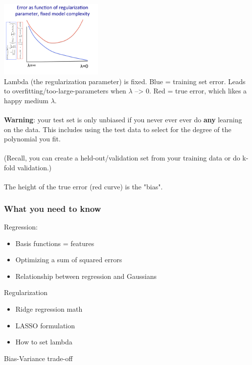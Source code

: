 \includegraphics[width=2in]{figures/Error--vs_lambda--fixed_model_complexity.pdf}   \hfill \\
Lambda (the regularization parameter) is fixed.  Blue = training set error.  
Leads to overfitting/too-large-parameters when $\lambda$ --> 0. 
Red = true error, which likes a happy medium $\lambda$.  \hfill \\  \hfill \\

\textbf{Warning}: your test set is only unbiased if you never ever ever do \textbf{any} learning on the data. 
This includes using the test data to select for the degree of the polynomial you fit.   \hfill \\  \hfill \\
(Recall, you can create a held-out/validation set from your training data or do k-fold validation.)  \hfill \\
\hfill \\

The height of the true error (red curve) is the "bias".  \hfill \\

\subsubsection{What you need to know}
Regression:
\begin{itemize}
	\item Basis functions = features
	\item Optimizing a sum of squared errors
	\item Relationship between regression and Gaussians
\end{itemize}
Regularization
\begin{itemize}
	\item Ridge regression math
	\item LASSO formulation
	\item How to set lambda
\end{itemize}
Bias-Variance trade-off





